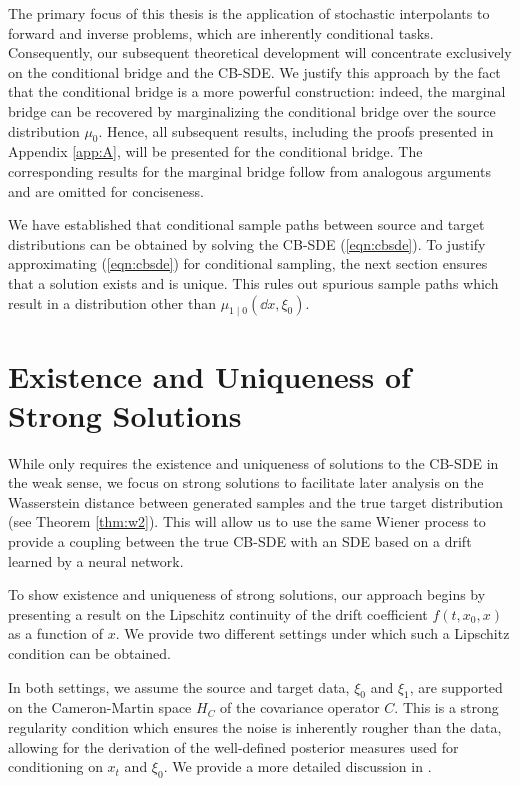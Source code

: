 The primary focus of this thesis is the application of stochastic interpolants to forward and inverse problems, which are inherently conditional tasks. Consequently, our subsequent theoretical development will concentrate exclusively on the conditional bridge and the CB-SDE. We justify this approach by the fact that the conditional bridge is a more powerful construction: indeed, the marginal bridge can be recovered by marginalizing the conditional bridge over the source distribution \(\mu_{0}\). Hence, all subsequent results, including the proofs presented in Appendix \ref{app:A}, will be presented for the conditional bridge. The corresponding results for the marginal bridge follow from analogous arguments and are omitted for conciseness.

We have established that conditional sample paths between source and target distributions can be obtained by solving the CB-SDE (\ref{eqn:cbsde}). To justify approximating (\ref{eqn:cbsde}) for conditional sampling, the next section ensures that a solution exists and is unique. This rules out spurious sample paths which result in a distribution other than \(\mu_{1\mid 0}(\dd{x}, \xi_{0})\).


\section{Existence and Uniqueness of Strong Solutions}\label{sec:eu}
While  only requires the existence and uniqueness of solutions to the CB-SDE in the weak sense, we focus on strong solutions to facilitate later analysis on the Wasserstein distance between generated samples and the true target distribution (see Theorem \ref{thm:w2}). This will allow us to use the same Wiener process to provide a coupling between the true CB-SDE with an SDE based on a drift learned by a neural network.

To show existence and uniqueness of strong solutions, our approach begins by presenting a result on the Lipschitz continuity of the drift coefficient \(f(t, x_{0}, x)\) as a function of \(x\). We provide two different settings under which such a Lipschitz condition can be obtained.

In both settings, we assume the source and target data, \(\xi_{0}\) and \(\xi_{1}\), are supported on the Cameron-Martin space \(H_{C}\) of the covariance operator \(C\). This is a strong regularity condition which ensures the noise is inherently rougher than the data, allowing for the derivation of the well-defined posterior measures used for conditioning on \(x_{t}\) and \(\xi_{0}\). We provide a more detailed discussion in .

